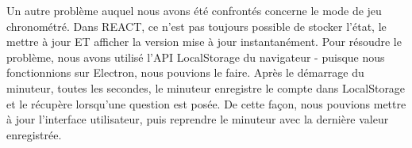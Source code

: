 \documentclass[a4paper, 12pt]{article}
\begin{document}
Un autre problème auquel nous avons été confrontés concerne le mode de jeu chronométré. Dans REACT, ce n'est pas toujours possible de stocker l'état, le mettre à jour ET afficher la version mise à jour instantanément. Pour résoudre le problème, nous avons utilisé l'API LocalStorage du navigateur - puisque nous fonctionnions sur Electron, nous pouvions le faire. Après le démarrage du minuteur, toutes les secondes, le minuteur enregistre le compte dans LocalStorage et le récupère lorsqu'une question est posée. De cette façon, nous pouvions mettre à jour l'interface utilisateur, puis reprendre le minuteur avec la dernière valeur enregistrée.
\end{document}
